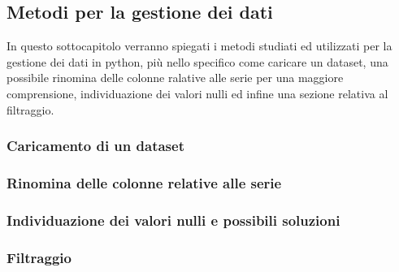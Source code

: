 \subsection{Metodi per la gestione dei dati}
In questo sottocapitolo verranno spiegati i metodi studiati ed utilizzati per la gestione dei
dati in python, più nello specifico come caricare un dataset, una possibile rinomina delle
colonne ralative alle serie per una maggiore comprensione, individuazione dei valori
nulli ed infine una sezione relativa al filtraggio.

\subsubsection{Caricamento di un dataset}
\subsubsection{Rinomina delle colonne relative alle serie}
\subsubsection{Individuazione dei valori nulli e possibili soluzioni}
\subsubsection{Filtraggio}


